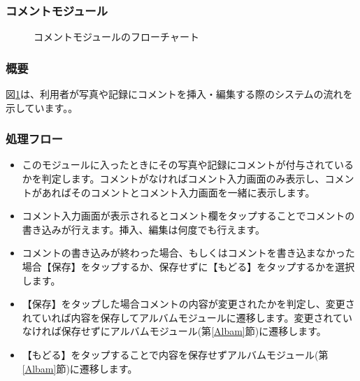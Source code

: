 \documentclass[a4j]{jarticle}
\begin{document}
\subsubsection{コメントモジュール\label{Coment}}
\begin{figure}[H]
    \begin{center}
    \caption {コメントモジュールのフローチャート}
    \label{coment}
    \end{center}
\end{figure}

\subsubsection*{概要}
図\ref{coment}は、利用者が写真や記録にコメントを挿入・編集する際のシステムの流れを示しています。。

\subsubsection*{処理フロー}
\begin{itemize}
\item このモジュールに入ったときにその写真や記録にコメントが付与されているかを判定します。コメントがなければコメント入力画面のみ表示し、コメントがあればそのコメントとコメント入力画面を一緒に表示します。
\item コメント入力画面が表示されるとコメント欄をタップすることでコメントの書き込みが行えます。挿入、編集は何度でも行えます。
\item コメントの書き込みが終わった場合、もしくはコメントを書き込まなかった場合【保存】をタップするか、保存せずに【もどる】をタップするかを選択します。
\item 【保存】をタップした場合コメントの内容が変更されたかを判定し、変更されていれば内容を保存してアルバムモジュールに遷移します。変更されていなければ保存せずにアルバムモジュール(第\ref{Albam}節)に遷移します。
\item 【もどる】をタップすることで内容を保存せずアルバムモジュール(第\ref{Albam}節)に遷移します。
\end{itemize}
\newpage
\end{document}
